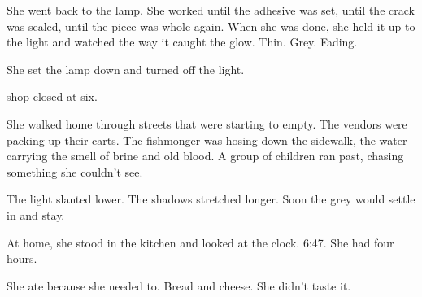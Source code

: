 \documentclass[12pt,letterpaper,openany]{book}
\begin{document}
She went back to the lamp. She worked until the adhesive was set, until the crack was sealed, until the piece was whole again. When she was done, she held it up to the light and watched the way it caught the glow. Thin. Grey. Fading.
\par
She set the lamp down and turned off the light.
\par
\hrulefillThe shop closed at six.
\par
She walked home through streets that were starting to empty. The vendors were packing up their carts. The fishmonger was hosing down the sidewalk, the water carrying the smell of brine and old blood. A group of children ran past, chasing something she couldn't see.
\par
The light slanted lower. The shadows stretched longer. Soon the grey would settle in and stay.
\par
At home, she stood in the kitchen and looked at the clock. 6:47. She had four hours.
\par
She ate because she needed to. Bread and cheese. She didn't taste it.
\par
\hrulefill
\end{document}
